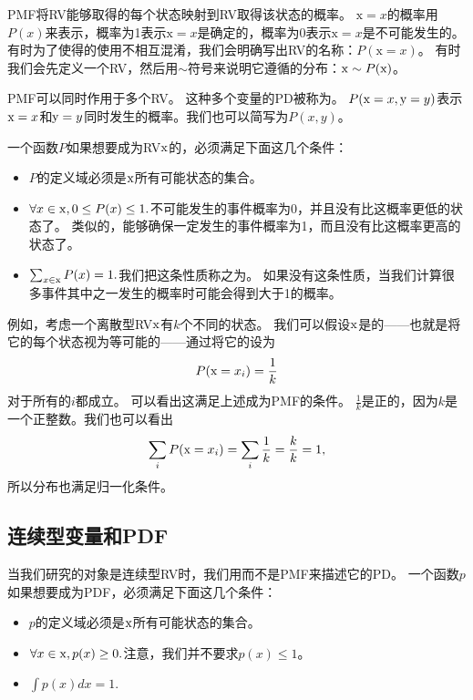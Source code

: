 
\gls{PMF}将\gls{RV}能够取得的每个状态映射到\gls{RV}取得该状态的概率。
$\mathrm{x} = x$的概率用$P(x)$来表示，概率为1表示$\mathrm{x} = x$是确定的，概率为0表示$\mathrm{x}=x$是不可能发生的。
有时为了使得的使用不相互混淆，我们会明确写出\gls{RV}的名称：$P(\mathrm{x} = x)$。
有时我们会先定义一个\gls{RV}，然后用$\sim$符号来说明它遵循的分布：$\mathrm{x}\sim P(\mathrm{x})$。

\gls{PMF}可以同时作用于多个\gls{RV}。
这种多个变量的\gls{PD}被称为。
$P(\mathrm{x} = x, \mathrm{y} = y)$表示$\mathrm{x} = x$和$\mathrm{y} = y$同时发生的概率。我们也可以简写为$P(x, y)$。

一个函数$P$如果想要成为\gls{RV}$\mathrm{x}$的，必须满足下面这几个条件：
\begin{itemize}
\item $P$的定义域必须是$\mathrm{x}$所有可能状态的集合。

\item $\forall x \in \mathrm{x}, 0\le P(x)\le 1.$不可能发生的事件概率为0，并且没有比这概率更低的状态了。
类似的，能够确保一定发生的事件概率为1，而且没有比这概率更高的状态了。

\item $\sum_{x \in \mathrm{x}} P(x) = 1.$我们把这条性质称之为。
如果没有这条性质，当我们计算很多事件其中之一发生的概率时可能会得到大于1的概率。
\end{itemize}

例如，考虑一个离散型\gls{RV}$\mathrm{x}$有$k$个不同的状态。
我们可以假设$\mathrm{x}$是的——也就是将它的每个状态视为等可能的——通过将它的设为
\begin{equation}
P(\mathrm{x} = x_i) = \frac{1}{k}
\end{equation}
对于所有的$i$都成立。
可以看出这满足上述成为\gls{PMF}的条件。
$\frac{1}{k}$是正的，因为$k$是一个正整数。我们也可以看出
\begin{equation}
\sum_i P(\mathrm{x} = x_i) = \sum_i \frac{1}{k} = \frac{k}{k} = 1,
\end{equation}
所以分布也满足归一化条件。


\subsection{连续型变量和\gls{PDF}}
\label{sec:continuous_variables_and_probability_density_functions}

当我们研究的对象是连续型\gls{RV}时，我们用而不是\gls{PMF}来描述它的\gls{PD}。
一个函数$p$如果想要成为\gls{PDF}，必须满足下面这几个条件：
\begin{itemize}
\item $p$的定义域必须是$\mathrm{x}$所有可能状态的集合。

\item $\forall x \in \mathrm{x}, p(x)\ge 0.$注意，我们并不要求$p(x)\le 1$。

\item $\int p(x) dx = 1.$
\end{itemize}

